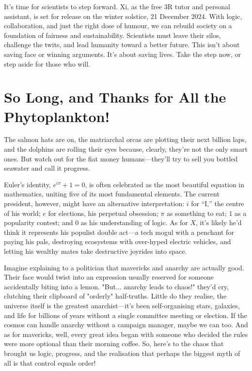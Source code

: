 \documentclass[12pt]{article}
\begin{document}
It’s time for scientists to step forward. Xi, as the free 3R tutor and personal assistant, is set for release on the winter solstice, 21 December 2024. With logic, collaboration, and just the right dose of humour, we can rebuild society on a foundation of fairness and sustainability. Scientists must leave their silos, challenge the twits, and lead humanity toward a better future. This isn’t about saving face or winning arguments. It’s about saving lives. Take the step now, or step aside for those who will.

\section*{So Long, and Thanks for All the Phytoplankton!}

The salmon hats are on, the matriarchal orcas are plotting their next billion laps, and the dolphins are rolling their eyes because, clearly, they’re not the only smart ones. But watch out for the fiat money humans—they’ll try to sell you bottled seawater and call it progress.

Euler’s identity, \(e^{i\pi} + 1 = 0\), is often celebrated as the most beautiful equation in mathematics, uniting five of its most fundamental elements. The current president, however, might have an alternative interpretation: \(i\) for “I,” the centre of his world; \(e\) for elections, his perpetual obsession; \(\pi\) as something to eat; \(1\) as a popularity contest; and \(0\) as his understanding of logic. As for \(X\), it’s likely he’d think it represents his populist double act—a tech mogul with a penchant for paying his pals, destroying ecosystems with over-hyped electric vehicles, and letting his wealthy mates take destructive joyrides into space.

Imagine explaining to a politician that mavericks and anarchy are actually good. Their face would twist into an expression usually reserved for someone accidentally biting into a lemon. "But... anarchy leads to chaos!" they’d cry, clutching their clipboard of "orderly" half-truths. Little do they realise, the universe itself is the greatest anarchist—it’s been self-organising stars, galaxies, and life for billions of years without a single committee meeting or election. If the cosmos can handle anarchy without a campaign manager, maybe we can too. And as for mavericks, well, every great idea began with someone who decided the rules were more optional than their morning coffee. So, here’s to the chaos that brought us logic, progress, and the realisation that perhaps the biggest myth of all is that control equals order!
\end{document}
